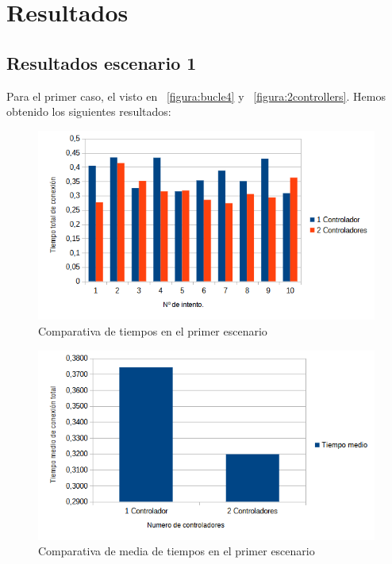 \documentclass[a4paper, 12pt]{book}
\begin{document}
	
	\clearpage
	\chapter{Resultados}
	\label{chap:resultados}
	\section{Resultados escenario 1} 
	\label{sec:resultEsc1}
 
 		Para el primer caso, el visto en ~\ref{figura:bucle4} y ~\ref{figura:2controllers}. Hemos obtenido los siguientes resultados:
 	
 	\begin{figure}[H]
 		\centering
 		\includegraphics[width=16cm, keepaspectratio]{img/comparativabucle4}
 		\caption{Comparativa de tiempos en el primer escenario}
 		\label{figura:comparativabucle4}
 	\end{figure}
 	
 	\begin{figure}[H]
 		\centering
 		\includegraphics[width=16cm, keepaspectratio]{img/comparativamediasbucle}
 		\caption{Comparativa de media de tiempos en el primer escenario}
 		\label{figura:mediabucle4}
 	\end{figure}
 	
\end{document}
